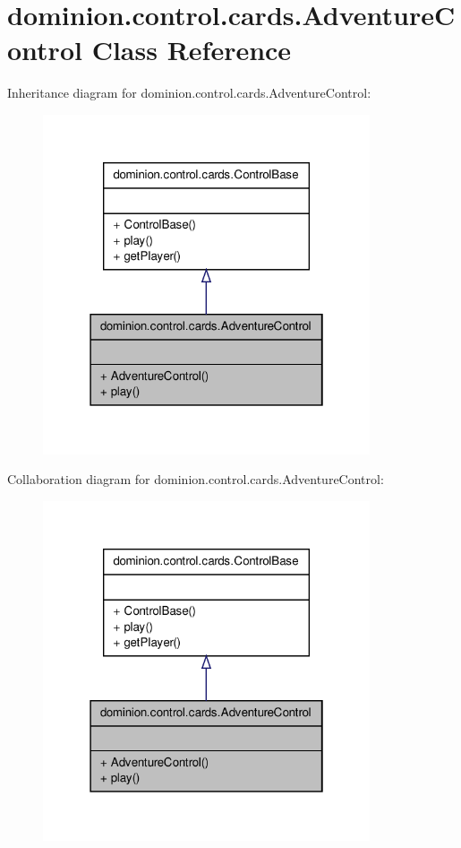 \hypertarget{classdominion_1_1control_1_1cards_1_1AdventureControl}{\section{dominion.\-control.\-cards.\-Adventure\-Control \-Class \-Reference}
\label{classdominion_1_1control_1_1cards_1_1AdventureControl}
}


\-Inheritance diagram for dominion.\-control.\-cards.\-Adventure\-Control\-:
\nopagebreak
\begin{figure}[H]
\begin{center}
\leavevmode
\includegraphics[width=274pt]{classdominion_1_1control_1_1cards_1_1AdventureControl__inherit__graph}
\end{center}
\end{figure}


\-Collaboration diagram for dominion.\-control.\-cards.\-Adventure\-Control\-:
\nopagebreak
\begin{figure}[H]
\begin{center}
\leavevmode
\includegraphics[width=274pt]{classdominion_1_1control_1_1cards_1_1AdventureControl__coll__graph}
\end{center}
\end{figure}
